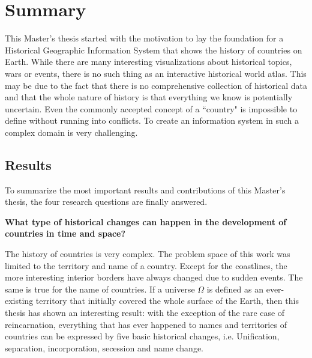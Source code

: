 
\chapter{Summary} %
\label{cha:summary}


This Master's thesis started with the motivation to lay the foundation for a Historical Geographic Information System that shows the history of countries on Earth. While there are many interesting visualizations about historical topics, wars or events, there is no such thing as an interactive historical world atlas. This may be due to the fact that there is no comprehensive collection of historical data and that the whole nature of history is that everything we know is potentially uncertain. Even the commonly accepted concept of a ``country" is impossible to define without running into conflicts. To create an information system in such a complex domain is very challenging.


\section{Results} %
\label{sec:results}

To summarize the most important results and contributions of this Master's thesis, the four research questions are finally answered.

\begin{description}[labelindent=0.55em]
  \item[\textbf{1)}]
  \textbf{
    What type of historical changes can happen in the development of countries in time and space?
  }
\end{description}

The history of countries is very complex. The problem space of this work was limited to the territory and name of a country. Except for the coastlines, the more interesting interior borders have always changed due to sudden events. The same is true for the name of countries. If a universe $\Omega$ is defined as an ever-existing territory that initially covered the whole surface of the Earth, then this thesis has shown an interesting result: with the exception of the rare case of reincarnation, everything that has ever happened to names and territories of countries can be expressed by five basic historical changes, i.e. Unification, separation, incorporation, secession and name change.

